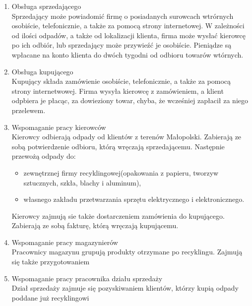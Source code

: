 

\begin{enumerate}
	\item Obsługa sprzedającego \\
	Sprzedający może powiadomić firmę o posiadanych surowcach wtrórnych osobiście, telefonicznie, a także za pomocą strony internetowej. W zależności od ilości odpadów, a także od lokalizacji klienta, firma może wysłać kierowcę po ich odbiór, lub sprzedający może przywieźć je osobiście. Pieniądze są wpłacane na konto klienta do dwóch tygodni od odbioru towarów wtórnych.
	\item Obsługa kupującego \\
	Kupujący składa zamówienie osobiście, telefonicznie, a także za pomocą strony internetwowej. Firma wysyła kierowcę z zamówieniem, a klient odpbiera je płacąc, za dowieziony towar, chyba, że wcześniej zapłacił za niego przelewem.
	\item Wspomaganie pracy kierowców \\
	Kierowcy odbierają odpady od klientów z terenów Małopolski. Zabierają ze sobą potwierdzenie odbioru, którą wręczają sprzedającemu. Następnie przewożą odpady do:
		\begin{itemize}
			\item zewnętrznej firmy recyklingowej(opakowania z papieru, tworzyw sztucznych, szkła, blachy i aluminum),
			\item własnego zakładu przetwarzania sprzętu elektrycznego i elektronicznego.
		\end{itemize}
	Kierowcy zajmują sie także dostarczeniem zamówienia do kupującego. Zabierają ze sobą fakturę, którą wręczają kupującemu.
	\item Wspomaganie pracy magazynierów \\
	Pracownicy magazynu grupują produkty otrzymane po recyklingu. Zajmują się także przygotowaniem 
	\item Wspomaganie pracy pracownika działu sprzedaży \\
	Dział sprzedaży zajmuje się pozyskiwaniem klientów, którzy kupią odpady poddane już recyklingowi
\end{enumerate}